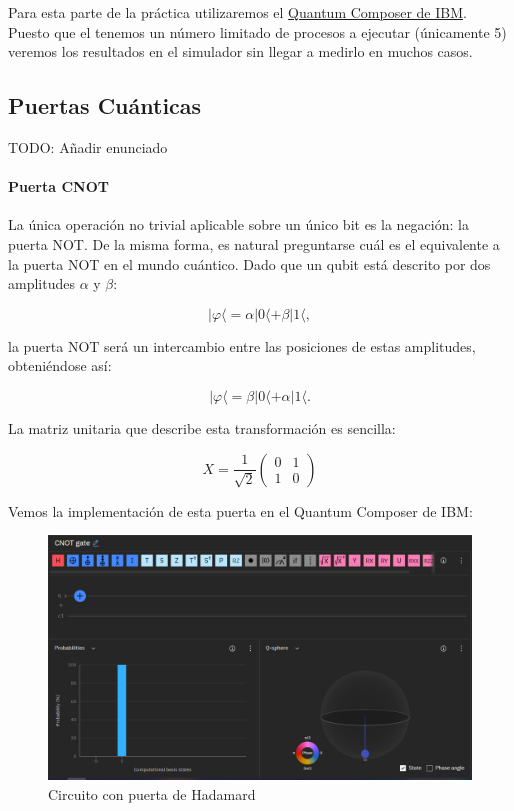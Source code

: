 \documentclass[11pt]{article}
\newcommand{\la}{\langle}
\begin{document}
Para esta parte de la práctica utilizaremos el \href{https://quantum-computing.ibm.com/composer}{Quantum Composer de IBM}. Puesto que el tenemos un número limitado de procesos a ejecutar (únicamente 5) veremos los resultados en el simulador sin llegar a medirlo en muchos casos.

\subsection{Puertas Cuánticas}

TODO: Añadir enunciado


\paragraph*{Puerta CNOT}

La única operación no trivial aplicable sobre un único bit es la negación: la puerta NOT. De la misma forma, es natural preguntarse cuál es el equivalente a la puerta NOT en el mundo cuántico. Dado que un qubit está descrito por dos amplitudes $\alpha$ y $\beta$:

\[
	|\varphi\la = \alpha |0\la + \beta |1\la,
\]

la puerta NOT será un intercambio entre las posiciones de estas amplitudes, obteniéndose así:

\[
	|\varphi\la = \beta |0\la + \alpha |1\la.
\]

La matriz unitaria que describe esta transformación es sencilla:

\[
X = \frac{1}{\sqrt 2}
\begin{pmatrix}
	0 & 1 \\
	1 & 0 
\end{pmatrix}
\]

Vemos la implementación de esta puerta en el Quantum Composer de IBM:

\begin{figure}[H]
	\centering
	\includegraphics[scale=0.4]{figures/gate-x.png}
	\caption{Circuito con puerta de Hadamard}
\end{figure}
\end{document}
